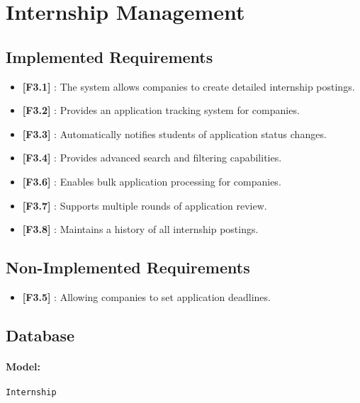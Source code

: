 \section{Internship Management}
\subsection*{Implemented Requirements}
\begin{itemize}
    \item \textbf{[F3.1]} : The system allows companies to create detailed internship postings.
    \item \textbf{[F3.2]} : Provides an application tracking system for companies.
    \item \textbf{[F3.3]} : Automatically notifies students of application status changes.
    \item \textbf{[F3.4]} : Provides advanced search and filtering capabilities.
    \item \textbf{[F3.6]} : Enables bulk application processing for companies.
    \item \textbf{[F3.7]} : Supports multiple rounds of application review.
    \item \textbf{[F3.8]} : Maintains a history of all internship postings.
\end{itemize}

\subsection*{Non-Implemented Requirements}
\begin{itemize}
    \item \textbf{[F3.5]} : Allowing companies to set application deadlines.
\end{itemize}

\subsection*{Database}
\paragraph{Model:} \texttt{Internship}
